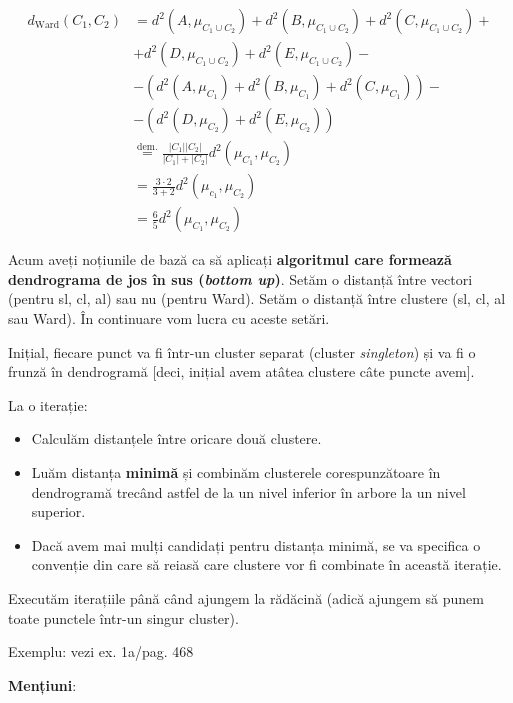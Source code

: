 \documentclass[12pt]{article}
\begin{document}
\begin{enumerate}
\begin{itemize}
		
		\begin{align*}
		d_\text{Ward}(C_1,C_2) &= d^2(A,\mu_{C_1 \cup C_2}) + d^2(B,\mu_{C_1 \cup C_2}) + d^2(C,\mu_{C_1 \cup C_2}) +\\
		&+ d^2(D,\mu_{C_1 \cup C_2}) + d^2(E,\mu_{C_1 \cup C_2}) -\\
		&- (d^2(A,\mu_{C_1}) + d^2(B,\mu_{C_1}) + d^2(C,\mu_{C_1})) -\\
		&- (d^2(D,\mu_{C_2}) + d^2(E,\mu_{C_2}))\\
		& \stackrel{\text{dem.}}{=} \frac{|C_1| |C_2|}{|C_1| + |C_2|} d^2(\mu_{C_1},\mu_{C_2})\\
		&=\frac{3 \cdot 2}{3+2} d^2(\mu_{c_1},\mu_{C_2})\\
		&=\frac{6}{5}d^2(\mu_{C_1},\mu_{C_2})
		\end{align*}
			
		\end{itemize}
		
	\end{enumerate}

	Acum aveți noțiunile de bază ca să aplicați \textbf{algoritmul care formează dendrograma de jos în sus (\textit{bottom up})}. Setăm o distanță între vectori (pentru sl, cl, al) sau nu (pentru Ward). Setăm o distanță între clustere (sl, cl, al sau Ward). În continuare vom lucra cu aceste setări.
	
	Inițial, fiecare punct va fi într-un cluster separat (cluster \textit{singleton}) și va fi o frunză în dendrogramă [deci, inițial avem atâtea clustere câte puncte avem].
	
	La o iterație:
	\begin{itemize}
		\item Calculăm distanțele între oricare două clustere.
		\item Luăm distanța \textbf{minimă} și combinăm clusterele corespunzătoare în dendrogramă trecând astfel de la un nivel inferior în arbore la un nivel superior.
		\item Dacă avem mai mulți candidați pentru distanța minimă, se va specifica o convenție din care să reiasă care clustere vor fi combinate în această iterație.
	\end{itemize} 
	
	Executăm iterațiile până când ajungem la rădăcină (adică ajungem să punem toate punctele într-un singur cluster).
	
	Exemplu: vezi ex. 1a/pag. 468
	
	\textbf{Mențiuni}:
	
\end{document}
